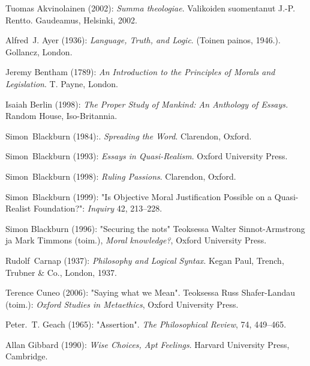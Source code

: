 \documentclass[a4paper,12pt,times,titlepage,finnish]{article}
\begin{document}
\begin{thebibliography}{29}

Tuomas Akvinolainen (2002):
\newblock \emph{Summa theologiae}.
\newblock Valikoiden suomentanut J.-P. Rentto.
\newblock Gaudeamus, Helsinki, 2002.

Alfred~J. Ayer (1936):
\newblock \emph{Language, Truth, and Logic}.
\newblock (Toinen painos, 1946.).
\newblock Gollancz, London.

Jeremy Bentham (1789):
\newblock \emph{An Introduction to the Principles of Morals and Legislation}.
\newblock T. Payne, London.

Isaiah Berlin (1998):
\newblock \emph{The Proper Study of Mankind: An Anthology of Essays.}
\newblock Random House, Iso-Britannia.

Simon~Blackburn (1984):.
\newblock \emph{Spreading the Word}.
\newblock Clarendon, Oxford.

Simon~Blackburn (1993):
\newblock \emph{Essays in Quasi-Realism}.
\newblock Oxford University Press.

Simon~Blackburn (1998):
\newblock \emph{Ruling Passions}.
\newblock Clarendon, Oxford.

Simon~Blackburn (1999):
\newblock "Is Objective Moral Justification Possible on a Quasi-Realist Foundation?":
\newblock \emph{Inquiry} 42, 213--228.

Simon Blackburn (1996):
\newblock "Securing the nots"
\newblock Teoksessa Walter Sinnot-Armstrong ja Mark Timmons (toim.),
  \emph{Moral knowledge?}, Oxford University Press.

Rudolf~Carnap (1937):
\newblock \emph{Philosophy and Logical Syntax}.
\newblock Kegan Paul, Trench, Trubner \& Co., London, 1937.

Terence Cuneo (2006):
"Saying what we Mean". Teoksessa Russ Shafer-Landau (toim.):
\newblock \emph{Oxford Studies in Metaethics},
\newblock Oxford University Press.


Peter.~T. Geach (1965):
\newblock "Assertion".
\newblock \emph{The Philosophical Review}, 74, 449--465.

Allan Gibbard (1990):
\newblock \emph{Wise Choices, Apt Feelings}.
\newblock Harvard University Press, Cambridge.



\end{thebibliography}
\end{document}
